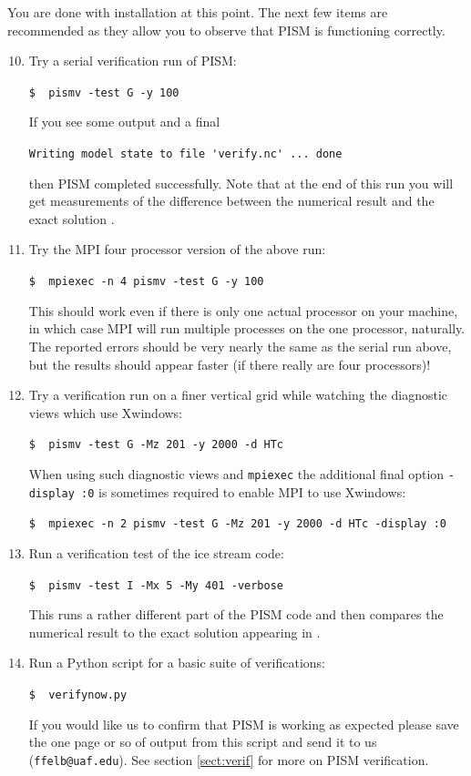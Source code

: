 \documentclass[11pt,final]{amsart}
\begin{document}
\bigskip
You are done with installation at this point.  The next few items are recommended as they allow you to observe that PISM is functioning correctly.
\bigskip

\begin{enumerate}\setcounter{enumi}{9}
\item \label{serialpismvrun} Try a serial verification run of PISM:

\verb|$  pismv -test G -y 100|

\noindent If you see some output and a final 

\verb|Writing model state to file 'verify.nc' ... done|

\noindent then PISM completed successfully.  Note that at the end of this run you will get measurements of the difference between the numerical result and the exact solution \cite{BBL}.

\item Try the MPI four processor version of the above run:

\verb|$  mpiexec -n 4 pismv -test G -y 100|

\noindent This should work even if there is only one actual processor on your machine, in which case MPI will run multiple processes on the one processor, naturally.  The reported errors should be very nearly the same as the serial run above, but the results should appear faster (if there really are four processors)!

\item Try a verification run on a finer vertical grid while watching the diagnostic views which use Xwindows:

\verb|$  pismv -test G -Mz 201 -y 2000 -d HTc|

\noindent When using such diagnostic views and \verb|mpiexec| the additional final option \verb|-display :0| is sometimes required to enable MPI to use Xwindows:

\verb|$  mpiexec -n 2 pismv -test G -Mz 201 -y 2000 -d HTc -display :0|

\item Run a verification test of the ice stream code:

\verb|$  pismv -test I -Mx 5 -My 401 -verbose|

\noindent This runs a rather different part of the PISM code and then compares the numerical result to the exact solution appearing in \cite{SchoofStream}.

\item Run a Python script for a basic suite of verifications:

\verb|$  verifynow.py|

\noindent If you would like us to confirm that PISM is working as expected please save the one page or so of output from this script and send it to us (\verb|ffelb@uaf.edu|).  See section \ref{sect:verif} for more on PISM verification.
\end{enumerate}
\bigskip
\end{document}
